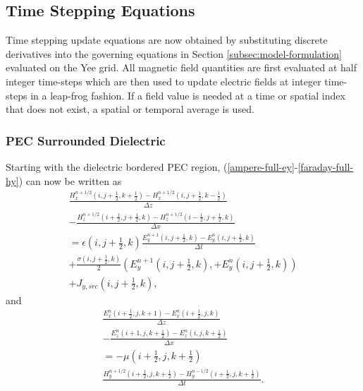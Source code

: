 \subsection{Time Stepping Equations}
\label{subsec:timestepeqs}
Time stepping update equations are now obtained by substituting discrete derivatives into the governing equations in Section \ref{subsec:model-formulation} evaluated on the Yee grid. All magnetic field quantities are first evaluated at half integer time-steps which are then used to update electric fields at integer time-steps in a leap-frog fashion. If a field value is needed at a time or spatial index that does not exist, a spatial or temporal average is used.

\subsubsection{PEC Surrounded Dielectric}
\label{subsubsec:pec-time}
Starting with the dielectric bordered PEC region, (\ref{ampere-full-ey}-\ref{faraday-full-hy}) can now be written as
\\
\begin{multline}
	\frac{H_x^{n+1/2}(i,j+\frac{1}{2},k+\frac{1}{2}) - H_x^{n+1/2}(i,j+\frac{1}{2},k-\frac{1}{2})}{\Delta z} \\ - \frac{H_z^{n+1/2}(i+\frac{1}{2},j+\frac{1}{2},k) - H_z^{n+1/2}(i-\frac{1}{2},j+\frac{1}{2},k)}{\Delta x} \\ = \epsilon(i,j+\tfrac{1}{2},k)\frac{E_y^{n+1}(i,j+\frac{1}{2},k) - E_y^{n}(i,j+\frac{1}{2},k)}{\Delta t} \\ + \frac{\sigma(i,j+\tfrac{1}{2},k)}{2}(E_y^{n+1}(i,j+\tfrac{1}{2},k),+E_y^{n}(i,j+\tfrac{1}{2},k)) \\ + J_{y,src}(i,j+\tfrac{1}{2},k),
	\label{eq:discrete-faraday}
\end{multline}
and
\begin{multline}
	\frac{E_x^n(i+\tfrac{1}{2},j,k+1)-E_x^n(i+\tfrac{1}{2},j,k)}{\Delta z} \\ - \frac{E_z^n(i+1,j,k+\tfrac{1}{2}) - E_z^n(i,j,k+\tfrac{1}{2})}{\Delta x} \\ =-\mu(i+\tfrac{1}{2},j,k+\tfrac{1}{2}) \\ \frac{H_y^{n+1/2}(i+\tfrac{1}{2},j,k+\tfrac{1}{2})-H_y^{n-1/2}(i+\tfrac{1}{2},j,k+\tfrac{1}{2})}{\Delta t}.
	\label{eq:discrete-ampere}
\end{multline}

